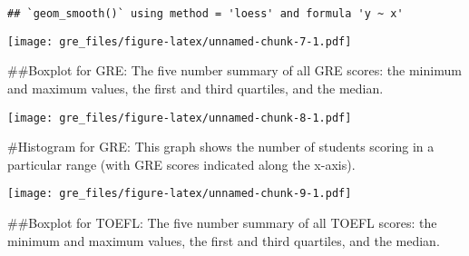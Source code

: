 \documentclass[
]{article}
\newenvironment{Shaded}{\begin{snugshade}}{\end{snugshade}}
\newcommand{\AttributeTok}[1]{\textcolor[rgb]{0.77,0.63,0.00}{#1}}
\newcommand{\ConstantTok}[1]{\textcolor[rgb]{0.00,0.00,0.00}{#1}}
\newcommand{\FunctionTok}[1]{\textcolor[rgb]{0.00,0.00,0.00}{#1}}
\newcommand{\NormalTok}[1]{#1}
\newcommand{\SpecialCharTok}[1]{\textcolor[rgb]{0.00,0.00,0.00}{#1}}
\newcommand{\StringTok}[1]{\textcolor[rgb]{0.31,0.60,0.02}{#1}}
\begin{document}
\begin{verbatim}
## `geom_smooth()` using method = 'loess' and formula 'y ~ x'
\end{verbatim}

\texttt{[image: gre\_files/figure-latex/unnamed-chunk-7-1.pdf]}

\#\#Boxplot for GRE: The five number summary of all GRE scores: the
minimum and maximum values, the first and third quartiles, and the
median.

\begin{Shaded}
\end{Shaded}

\texttt{[image: gre\_files/figure-latex/unnamed-chunk-8-1.pdf]}

\#Histogram for GRE: This graph shows the number of students scoring in
a particular range (with GRE scores indicated along the x-axis).

\begin{Shaded}
\end{Shaded}

\texttt{[image: gre\_files/figure-latex/unnamed-chunk-9-1.pdf]}

\#\#Boxplot for TOEFL: The five number summary of all TOEFL scores: the
minimum and maximum values, the first and third quartiles, and the
median.

\begin{Shaded}
\end{Shaded}
\end{document}
